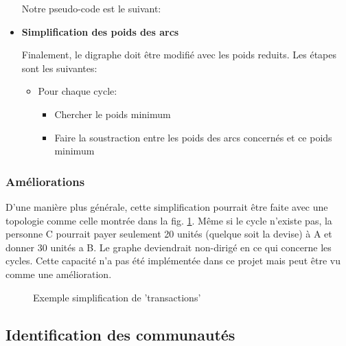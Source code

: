 \documentclass[11pt,a4paper]{article}
\begin{document}
\begin{itemize}
Notre pseudo-code est le suivant:



\item \textbf{Simplification des poids des arcs}

  Finalement, le digraphe doit être modifié avec les poids
  reduits. Les étapes sont les suivantes:

  \begin{itemize}
  \item Pour chaque cycle:
    \begin{itemize}
    \item Chercher le poids minimum
    \item Faire la soustraction entre les poids des arcs concernés et
      ce poids minimum
    \end{itemize}
  \end{itemize}
\end{itemize}

\subsubsection{Améliorations}


D'une manière plus générale, cette simplification pourrait être faite
avec une topologie comme celle montrée dans la
fig. \ref{fig:simple2}. Même si le cycle n'existe pas, la personne C
pourrait payer seulement 20 unités (quelque soit la devise) à A et
donner 30 unités a B. Le graphe deviendrait non-dirigé en ce qui
concerne les cycles. Cette capacité n'a pas été implémentée dans ce
projet mais peut être vu comme une amélioration.

\begin{figure}[ht!]  \centering
  \caption{Exemple simplification de 'transactions'}
  \label{fig:simple2}
\end{figure}

\newpage
\subsection{Identification des communautés}
\end{document}
